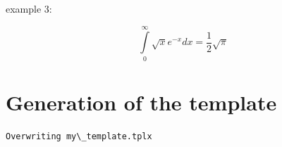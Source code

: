 \documentclass[reprint, floatfix, groupaddress, prb]{article}
\begin{document}
    example 3:

\[ \int\limits_0^\infty {\sqrt{x} e^{ - x} dx} = \frac{1}{2}\sqrt{\pi}\]

    \hypertarget{generation-of-the-template}{%
\section{Generation of the template}\label{generation-of-the-template}}

    \begin{Verbatim}[commandchars=\\\{\}]
Overwriting my\_template.tplx
    \end{Verbatim}


    
    
    
\end{document}
